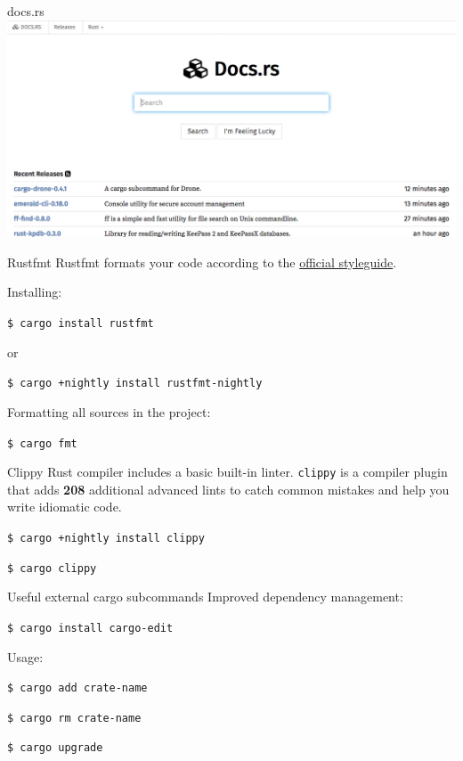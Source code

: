 \documentclass[12pt, aspectratio=169]{beamer}
\begin{document}
\begin{frame}{docs.rs}
  \includegraphics[width=\textwidth]{images/docs-rs.png}
\end{frame}

\begin{frame}{Rustfmt}
  Rustfmt formats your code according to the
  \href{https://github.com/rust-lang-nursery/fmt-rfcs}{official styleguide}.

  Installing:

  \texttt{\$ cargo install rustfmt}

  or

  \texttt{\$ cargo +nightly install rustfmt-nightly}

  Formatting all sources in the project:

  \texttt{\$ cargo fmt}
\end{frame}

\begin{frame}{Clippy}
  Rust compiler includes a basic built-in linter. \texttt{clippy} is a compiler
  plugin that adds \textbf{208} additional advanced lints to catch common
  mistakes and help you write idiomatic code.

  \texttt{\$ cargo +nightly install clippy}

  \texttt{\$ cargo clippy}
\end{frame}

\begin{frame}{Useful external cargo subcommands}
  Improved dependency management:

  \texttt{\$ cargo install cargo-edit}

  Usage:

  \texttt{\$ cargo add crate-name}

  \texttt{\$ cargo rm crate-name}

  \texttt{\$ cargo upgrade}
\end{frame}
\end{document}
